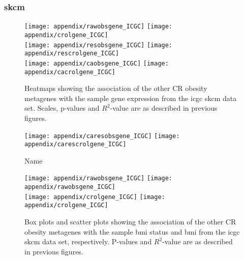 \begin{appendices}
	\newpage

	\subsubsection{\gls{skcm}}
	\label{ssub:skcm}
	
	\begin{figure}[htp!]
		\centering
		\texttt{[image: appendix/rawobsgene\_ICGC]}
		\hfill
		\texttt{[image: appendix/crolgene\_ICGC]}\\
		\texttt{[image: appendix/resobsgene\_ICGC]}
		\hfill
		\texttt{[image: appendix/rescrolgene\_ICGC]}\\
		\texttt{[image: appendix/caobsgene\_ICGC]}
		\hfill
		\texttt{[image: appendix/cacrolgene\_ICGC]}\\
		\caption{Heatmaps showing the association of the other CR obesity metagenes with the sample gene expression from the \gls{icgc} \gls{skcm} data set.
		Scales, p-values and $R^2$-value are as described in previous figures.}
		\label{fig:degmetaicgc_skcm}
	\end{figure}

	\begin{figure}[htpb]
		\ContinuedFloat
		\captionsetup{list=off,format=cont}
		\centering
		\texttt{[image: appendix/caresobsgene\_ICGC]}
		\hfill
		\texttt{[image: appendix/carescrolgene\_ICGC]}\\
		\caption{Name}
	\end{figure}

	\begin{figure}[!htpb]
		\centering
		\texttt{[image: appendix/rawobsgene\_ICGC]}
		\hfill
		\texttt{[image: appendix/rawobsgene\_ICGC]}\\
		\texttt{[image: appendix/crolgene\_ICGC]}
		\hfill
		\texttt{[image: appendix/crolgene\_ICGC]}\\
		\caption{Box plots and scatter plots showing the association of the other CR obesity metagenes with the sample \gls{bmi} status  and \gls{bmi} from the \gls{icgc} \gls{skcm} data set, respectively.
	P-values and $R^2$-value are as described in previous figures.}
		\label{fig:appendix/cr_ob_meta_box_scatter_skcm}
	\end{figure}


\end{appendices}
